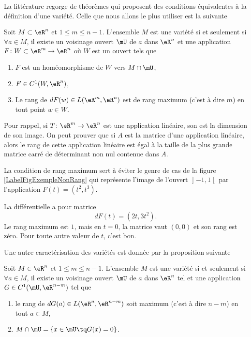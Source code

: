 La littérature regorge de théorèmes qui proposent des conditions équivalentes à la définition d'une variété. Celle que nous allons le plus utiliser est la suivante%
\begin{proposition}
	Soit $M\subset\eR^n$ et $1\leq m\leq n-1$. L'ensemble $M$ est une variété si et seulement si $\forall a\in M$, il existe un voisinage ouvert $\mU$ de $a$ dans $\eR^n$ et une application $F\colon W\subset\eR^m\to \eR^n$ où $W$ est un ouvert tels que
	\begin{enumerate}
		\item
			$F$ est un homéomorphisme de $W$ vers $M\cap\mU$,
		\item
			$F\in C^1(W,\eR^n)$,
		\item
			Le rang de $dF(w)\in L(\eR^m,\eR^n)$ est de rang maximum (c'est à dire $m$) en tout point $w\in W$.
	\end{enumerate}
\end{proposition}
Pour rappel, si $T\colon \eR^m\to \eR^n$ est une application linéaire, son  est la dimension de son image. On peut prouver que si $A$ est la matrice d'une application linéaire, alors le rang de cette application linéaire est égal à la taille de la plus grande matrice carré de déterminant non nul contenue dans $A$.

La condition de rang maximum sert à éviter le genre de cas de la figure \ref{LabelFigExempleNonRang} qui représente l'image de l'ouvert $\mathopen] -1 , 1 \mathclose[$ par l'application $F(t)=(t^2,t^3)$.
\newcommand{\CaptionFigExempleNonRang}{Quelque chose qui n'est pas de rang maximum et qui n'est pas une variété.}

%
La différentielle a pour matrice
\begin{equation}
	dF(t)=(2t,3t^2).
\end{equation}
Le rang maximum est $1$, mais en $t=0$, la matrice vaut $(0,0)$ et son rang est zéro. Pour toute autre valeur de $t$, c'est bon.

Une autre caractérisation des variétés est donnée par la proposition suivante %
\begin{proposition}		\label{PropCarVarZerFonc}
	Soit $M\in \eR^n$ et $1\leq m\leq n-1$. L'ensemble $M$ est une variété si et seulement si $\forall a\in M$, il existe un voisinage ouvert $\mU$ de $a$ dans $\eR^n$ tel et une application $G\in C^1(\mU,\eR^{n-m})$ tel que
	\begin{enumerate}

		\item
			le rang de $dG(a)\in L(\eR^n,\eR^{n-m})$ soit maximum (c'est à dire $n-m$) en tout $a\in M$,
		\item
			$M\cap\mU=\{ x\in\mU\tq G(x)=0 \}$.

	\end{enumerate}
\end{proposition}

